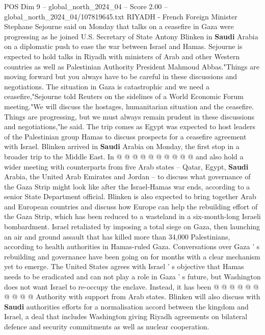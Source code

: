 \begin{textsample}{POS Dim 9 – global\_north\_2024\_04 – Score 2.00 – global\_north\_2024\_04/107819645.txt}  \label{ex:f9_pos_180}
RIYADH - French Foreign Minister Stephane Sejourne said on Monday that talks on a ceasefire in Gaza were progressing as he joined U.S.
Secretary of State Antony Blinken in \textbf{Saudi} Arabia on a diplomatic push to ease the war between Israel and Hamas.
Sejourne is expected to hold talks in Riyadh with ministers of Arab and other Western countries as well as Palestinian Authority President Mahmoud Abbas."Things are moving forward but you always have to be careful in these discussions and negotiations.
The situation in Gaza is catastrophic and we need a ceasefire,"Sejourne told Reuters on the sidelines of a World Economic Forum meeting."We will discuss the hostages, humanitarian situation and the ceasefire.
Things are progressing, but we must always remain prudent in these discussions and negotiations,"he said.
The trip comes as Egypt was expected to host leaders of the Palestinian group Hamas to discuss prospects for a ceasefire agreement with Israel.
Blinken arrived in \textbf{Saudi} Arabia on Monday, the first stop in a broader trip to the Middle East.
In @ @ @ @ @ @ @ @ @ @ and also hold a wider meeting with counterparts from five Arab states -- Qatar, Egypt, \textbf{Saudi} Arabia, the United Arab Emirates and Jordan -- to discuss what governance of the Gaza Strip might look like after the Israel-Hamas war ends, according to a senior State Department official.
Blinken is also expected to bring together Arab and European countries and discuss how Europe can help the rebuilding effort of the Gaza Strip, which has been reduced to a wasteland in a six-month-long Israeli bombardment.
Israel retaliated by imposing a total siege on Gaza, then launching an air and ground assault that has killed more than 34,000 Palestinians, according to health authorities in Hamas-ruled Gaza.
Conversations over Gaza ' s rebuilding and governance have been going on for months with a clear mechanism yet to emerge.
The United States agrees with Israel ' s objective that Hamas needs to be eradicated and can not play a role in Gaza ' s future, but Washington does not want Israel to re-occupy the enclave.
Instead, it has been @ @ @ @ @ @ @ @ @ @ Authority with support from Arab states.
Blinken will also discuss with \textbf{Saudi} authorities efforts for a normalisation accord between the kingdom and Israel, a deal that includes Washington giving Riyadh agreements on bilateral defence and security commitments as well as nuclear cooperation.

\end{textsample}
